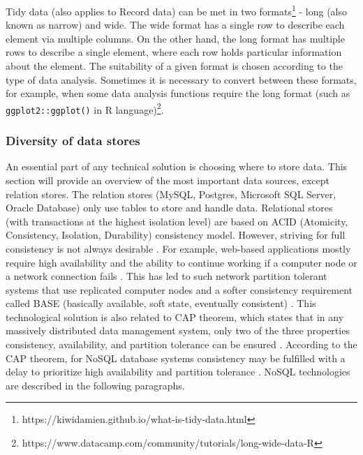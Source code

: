				Tidy data (also applies to Record data) can be met in two formats\footnote{https://kiwidamien.github.io/what-is-tidy-data.html} - long (also known as narrow) and wide. The wide format has a single row to describe each element via multiple columns. On the other hand, the long format has multiple rows to describe a single element, where each row holds particular information about the element. The suitability of a given format is chosen according to the type of data analysis. Sometimes it is necessary to convert between these formats, for example, when some data analysis functions require the long format (such as \texttt{ggplot2::ggplot()} in R language)\footnote{https://www.datacamp.com/community/tutorials/long-wide-data-R}. 	
					
												
    		\subsubsection{Diversity of data stores}
    		\label{subsec:diversity_of_data_stores}
    		 		
				
				An essential part of any technical solution is choosing where to store data. This section will provide an overview of the most important data sources, except relation stores. The relation stores (MySQL, Postgres, Microsoft SQL Server, Oracle Database) only use tables to store and handle data. Relational stores (with transactions at the highest isolation level)\cite{AndreasMeier2019} are based on ACID (Atomicity, Consistency, Isolation, Durability) consistency model. However, striving for full consistency is not always desirable \cite{AndreasMeier2019}. For example, web-based applications mostly require high availability and the ability to continue working if a computer node or a network connection fails \cite{AndreasMeier2019}. This has led to such network partition tolerant systems that use replicated computer nodes and a softer consistency requirement called BASE (basically available, soft state, eventually consistent) \cite{AndreasMeier2019}. This technological solution is also related to CAP theorem, which states that in any massively distributed data management system, only two of the three properties consistency, availability, and partition tolerance can be ensured \cite{AndreasMeier2019}. According to the CAP theorem,  for NoSQL database systems consistency may be fulfilled with a delay to prioritize high availability and partition tolerance \cite{AndreasMeier2019}. NoSQL technologies are described in the following paragraphs.
											

